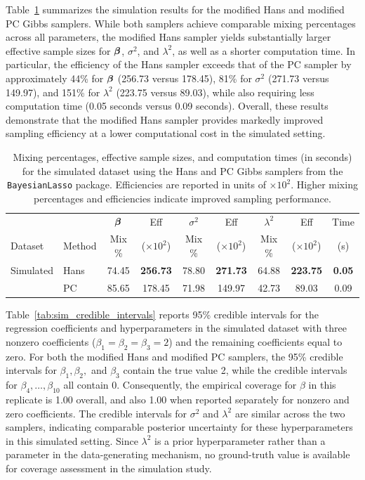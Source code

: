 Table~\ref{tab:simulation_results} summarizes the simulation results for the modified 
Hans and modified PC Gibbs samplers. While both samplers achieve comparable mixing 
percentages across all parameters, the modified Hans sampler yields substantially 
larger effective sample sizes for ${\boldsymbol \beta}$, $\sigma^2$, and $\lambda^2$, as well as 
a shorter computation time. In particular, the efficiency of the Hans sampler exceeds 
that of the PC sampler by approximately 44\% for ${\boldsymbol \beta}$ (256.73 versus 178.45), 
81\% for $\sigma^2$ (271.73 versus 149.97), and 151\% for $\lambda^2$ (223.75 versus 
89.03), while also requiring less computation time (0.05 seconds versus 0.09 seconds). 
Overall, these results demonstrate that the modified Hans sampler provides markedly 
improved sampling efficiency at a lower computational cost in the simulated setting.


\begin{table}[ht]
\centering
\begin{tabular}{l|l|cc|cc|cc|c}
 \toprule
            &       &  ${\boldsymbol \beta}$  & Eff                & $\sigma^2$   & Eff                  & $\lambda^2$   & Eff                      & Time \\
    Dataset & Method & Mix \%  & ($\times 10^2$)     & Mix \%  & ($\times 10^2$)       & Mix \%  & ($\times 10^2$)           &  (s) \\
\midrule 
Simulated 
& Hans 
& 74.45 & \textbf{256.73}
& 78.80 & \textbf{271.73}
& 64.88 & \textbf{223.75}
& \textbf{0.05} \\
& PC 
& 85.65 & 178.45
& 71.98 & 149.97
& 42.73 & 89.03
&  0.09 \\
\hline
\end{tabular}
\caption{Mixing percentages, effective sample sizes, and computation times (in seconds) 
for the simulated dataset using the Hans and PC Gibbs samplers 
from the \texttt{BayesianLasso} package. Efficiencies are reported in units of 
$\times 10^2$. Higher mixing percentages and efficiencies indicate improved 
sampling performance.}
\label{tab:simulation_results}
\end{table}



Table~\ref{tab:sim_credible_intervals} reports 95\% credible intervals for the regression coefficients and hyperparameters in the simulated dataset with three nonzero coefficients ($\beta_1=\beta_2=\beta_3=2$) and the remaining coefficients equal to zero. 
For both the modified Hans and modified PC samplers, the 95\% credible intervals for $\beta_1,\beta_2,$ and $\beta_3$ contain the true value 2, while the credible intervals for $\beta_4,\ldots,\beta_{10}$ all contain 0. 
Consequently, the empirical coverage for $\beta$ in this replicate is 1.00 overall, and also 1.00 when reported separately for nonzero and zero coefficients. 
The credible intervals for $\sigma^2$ and $\lambda^2$ are similar across the two samplers, indicating comparable posterior uncertainty for these hyperparameters in this simulated setting. Since $\lambda^2$ is a prior hyperparameter rather than a parameter in the data-generating mechanism, no ground-truth value is available for coverage assessment in the simulation study.



